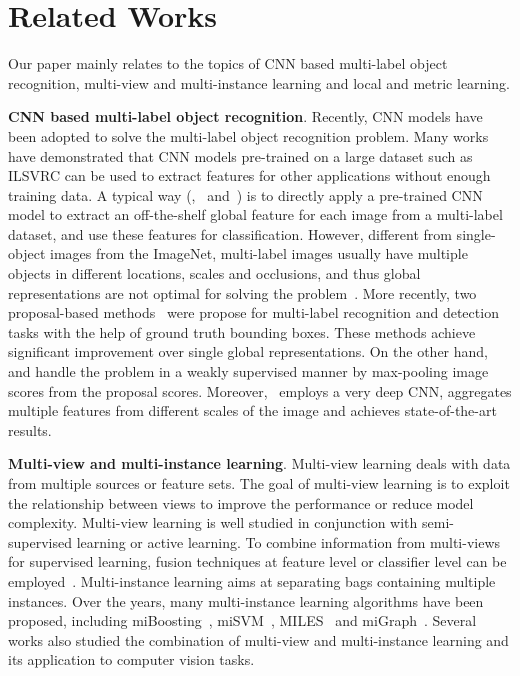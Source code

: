 \documentclass[10pt,twocolumn,letterpaper]{article}
\begin{document}
\section{Related Works} \label{related}

Our paper mainly relates to the topics of CNN based multi-label
object recognition, multi-view and multi-instance learning and
local and metric learning.

{\bf CNN based multi-label object recognition}. Recently, CNN
models have been adopted to solve the multi-label object
recognition problem. Many
works~\cite{girshick2014,Sermanet2013,OquabCVPR2014,Oquab2014,Wei2014}
have demonstrated that CNN models pre-trained on a large dataset
such as ILSVRC can be used to extract features for other
applications without enough training data. A typical way
(\cite{Sermanet2013},~\cite{Razavian2014}
and~\cite{Chatfield2014}) is to directly apply a pre-trained CNN
model to extract an off-the-shelf global feature for each image
from a multi-label dataset, and use these features for
classification. However, different from single-object images from
the ImageNet, multi-label images usually have multiple objects in
different locations, scales and occlusions, and thus global
representations are not optimal for solving the
problem~\cite{Wei2014}. More recently, two proposal-based
methods~\cite{OquabCVPR2014,girshick2014} were propose for
multi-label recognition and detection tasks with the help of
ground truth bounding boxes. These methods achieve significant
improvement over single global representations. On the other hand,
\cite{Oquab2014} and \cite{Wei2014} handle the problem in a weakly
supervised manner by max-pooling image scores from the proposal
scores. Moreover,~\cite{Simonyan2014} employs a very deep CNN,
aggregates multiple features from different scales of the image
and achieves state-of-the-art results.

{\bf Multi-view and multi-instance learning}. Multi-view learning
deals with data from multiple sources or feature sets. The goal of
multi-view learning is to exploit the relationship between views
to improve the performance or reduce model complexity. Multi-view
learning is well studied in conjunction with semi-supervised
learning or active learning. To combine information from
multi-views for supervised learning, fusion techniques at feature
level or classifier level can be employed~\cite{Zhang2014}.
Multi-instance learning aims at separating bags containing
multiple instances. Over the years, many multi-instance learning
algorithms have been proposed, including miBoosting~\cite{Xu2004},
miSVM~\cite{Andrews2003}, MILES~\cite{Chen2006} and
miGraph~\cite{Zhou2009}. Several works also studied the
combination of multi-view and multi-instance learning and its
application to computer vision tasks.
\end{document}
